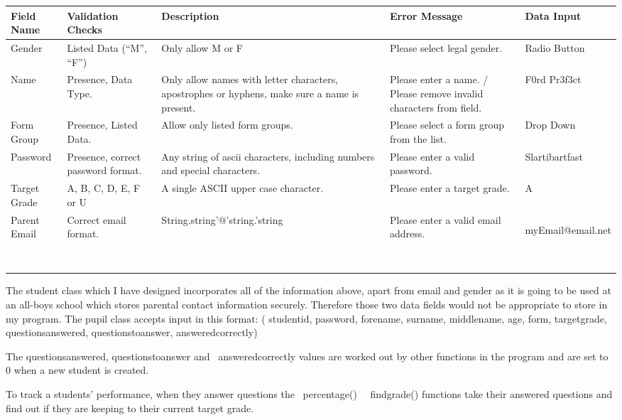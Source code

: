 \documentclass[a4paper,12pt]{report}
\begin{document}
\begin{flushleft}
\tablefirsthead{}
\tablehead{}
\tabletail{}
\tablelasttail{}
\begin{supertabular}{|m{0.7156598in}|m{0.69835985in}|m{2.19556in}|m{0.8288598in}|m{1.5691599in}|}
\hline
Field Name &
Validation Checks &
Description &
Error Message &
Data Input\\\hline
Gender &
Listed Data (``M'', ``F'') &
Only allow M or F &
Please select legal gender. &
Radio Button\\\hline
Name &
Presence, Data Type. &
Only allow names with letter characters, apostrophes or hyphens, make sure a name is present. &
Please enter a name. / Please remove invalid characters from field. &
F0rd Pr3f3ct\\\hline
Form Group &
Presence, Listed Data. &
Allow only listed form groups. &
Please select a form group from the list. &
Drop Down\\\hline
Password &
Presence, correct password format. &
Any string of ascii characters, including numbers and special characters. &
Please enter a valid password. &
Slartibartfast\\\hline
Target Grade &
A, B, C, D, E, F or U &
A single ASCII upper case character. &
Please enter a target grade. &
A\\\hline
Parent Email &
Correct email format. &
{}String.string'@'string.'string &
Please enter a valid email address. &
myEmail@email.net

~
\\\hline
\end{supertabular}
\end{flushleft}

\bigskip


\bigskip

The student class which I have designed incorporates all of the information above, apart from email and gender as it is going to be used at an all-boys school which stores parental contact information securely. Therefore those two data fields would not be appropriate to store in my program. The pupil class accepts input in this format: ( studentid, password, forename, surname, middlename, age, form, targetgrade, questionsanswered, questionstoanswer, answeredcorrectly)


\bigskip

The questionsanswered, questionstoanswer and \ answeredcorrectly values are worked out by other functions in the program and are set to 0 when a new student is created.

To track a students' performance, when they answer questions the \ percentage() \ \ findgrade() functions take their answered questions and find out if they are keeping to their current target grade.
\end{document}

